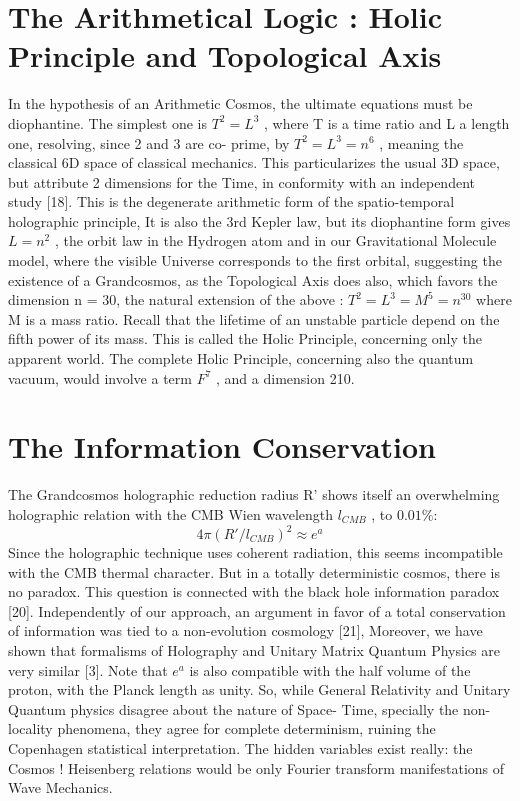 \section {The Arithmetical Logic : Holic Principle and Topological Axis}

In the hypothesis of an Arithmetic Cosmos, the ultimate equations must be diophantine. The
simplest one is $T^{2} = L^{3}$ , where T is a time ratio and L a length one, resolving, since 2 and 3 are co-
prime, by $T^{2} = L^{3} = n^{6}$ , meaning the classical 6D space of classical mechanics. This particularizes
the usual 3D space, but attribute 2 dimensions for the Time, in conformity with an independent
study [18].
This is the degenerate arithmetic form of the spatio-temporal holographic principle, It is also the
3rd Kepler law, but its diophantine form gives $L = n^{2}$ , the orbit law in the Hydrogen atom and in our
Gravitational Molecule model, where the visible Universe corresponds to the first orbital,
suggesting the existence of a Grandcosmos, as the Topological Axis does also, which favors the
dimension n = 30, the natural extension of the above :
$T^{2} = L^{3} = M^{5} = n^{30}$ where M is a mass ratio. Recall that the lifetime of an unstable particle depend on the fifth power of its mass. This is called the Holic Principle, concerning only the apparent world. The complete Holic
Principle, concerning also the quantum vacuum, would involve a term $F^{7}$ , and a dimension 210.

\section {The Information Conservation}

The Grandcosmos holographic reduction radius R' shows itself an overwhelming holographic
relation with the CMB Wien wavelength $l_{CMB}$ , to $0.01\%$:
$$4\pi(R\prime/l_{CMB})^{2} \approx e^{a}$$
Since the holographic technique uses coherent radiation, this seems incompatible with the CMB
thermal character. But in a totally deterministic cosmos, there is no paradox. This question is
connected with the black hole information paradox [20]. Independently of our approach, an
argument in favor of a total conservation of information was tied to a non-evolution cosmology
[21], Moreover, we have shown that formalisms of Holography and Unitary Matrix Quantum
Physics are very similar [3]. Note that $e^{a}$ is also compatible with the half volume of the proton, with
the Planck length as unity.
So, while General Relativity and Unitary Quantum physics disagree about the nature of Space-
Time, specially the non-locality phenomena, they agree for complete determinism, ruining the
Copenhagen statistical interpretation. The hidden variables exist really: the Cosmos ! Heisenberg
relations would be only Fourier transform manifestations of Wave Mechanics.

